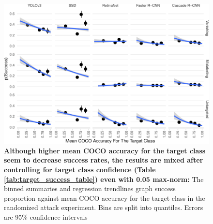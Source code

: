 \begin{figure}[tb]

{\centering \includegraphics{imgs/target_success_graph-1} 

}

\caption{\textbf{Although higher mean COCO accuracy for the target class seem to decrease success rates, the results are mixed after controlling for target class confidence (Table \ref{tab:target_success_table}) even with 0.05 max-norm:}  The binned summaries and regression trendlines graph success proportion against mean COCO accuracy for the target class in the randomized attack experiment. Bins are split into quantiles. Errors are 95\% confidence intervals}\label{fig:target_success_graph}
\end{figure}

\begingroup\fontsize{9}{11}\selectfont

